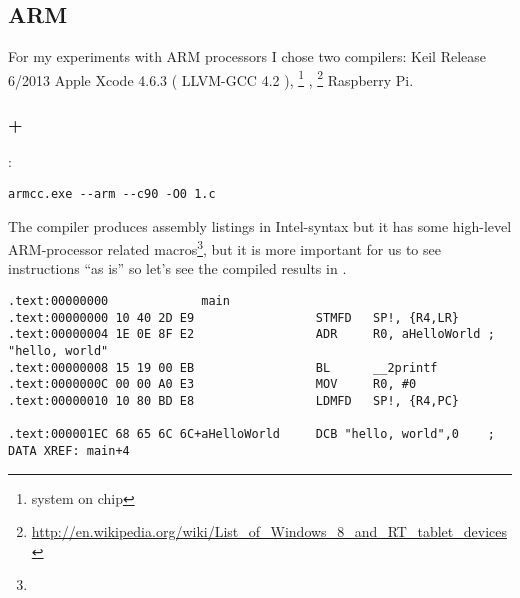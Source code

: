 ﻿\subsection{ARM}
\label{sec:hw_ARM}

\index{\idevices}
{For my experiments with ARM processors I chose two compilers}: 
 Keil Release 6/2013 
 Apple Xcode 4.6.3  ( LLVM-GCC 4.2 ), 
 \footnote{system on chip} \In \idevices, 
\footnote{\url{http://en.wikipedia.org/wiki/List_of_Windows_8_and_RT_tablet_devices}} 
 Raspberry Pi.

\subsubsection{\NonOptimizingKeil + \ARMMode}

:

\begin{lstlisting}
armcc.exe --arm --c90 -O0 1.c 
\end{lstlisting}

\index{\IntelSyntax}
{The  compiler produces assembly listings in Intel-syntax} 
{but it has some high-level ARM-processor related macros}\footnote{
}, 
{but it is more important for us to see instructions ``as is'' so let's see the compiled results in \IDA}.

\begin{lstlisting}[caption=\NonOptimizingKeil + \ARMMode + \IDA]
.text:00000000             main
.text:00000000 10 40 2D E9                 STMFD   SP!, {R4,LR}
.text:00000004 1E 0E 8F E2                 ADR     R0, aHelloWorld ; "hello, world"
.text:00000008 15 19 00 EB                 BL      __2printf
.text:0000000C 00 00 A0 E3                 MOV     R0, #0
.text:00000010 10 80 BD E8                 LDMFD   SP!, {R4,PC}

.text:000001EC 68 65 6C 6C+aHelloWorld     DCB "hello, world",0    ; DATA XREF: main+4
\end{lstlisting}

